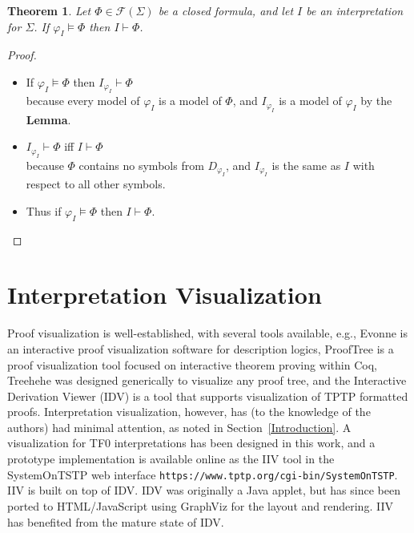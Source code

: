 \documentclass[letterpaper]{article}
\newcommand{\smalltt}[1]{\small \texttt{#1}}
\newtheorem*{theorem}{Theorem}
\begin{document}
\begin{theorem}
Let $\Phi \in \mathcal{F}(\Sigma)$ be a closed formula, and let $I$ be an interpretation for
$\Sigma$. 
If $\varphi_I \models \Phi$ then $I \vdash \Phi$.
\end{theorem}
\vspace*{-1em}
\begin{proof}
~\linebreak
\vspace*{-1.5em}
\begin{itemize}
\item If $\varphi_I \models \Phi$ then $I_{\varphi_I} \vdash \Phi$ \\
      because every model of $\varphi_I$ is a model of $\Phi$, and $I_{\varphi_I}$ is a model
      of $\varphi_I$ by the {\bf Lemma}.
\item $I_{\varphi_I} \vdash \Phi$ iff $I \vdash \Phi$ \\
      because $\Phi$ contains no symbols from $D_{\varphi_I}$, and $I_{\varphi_I}$ is the same
      as $I$ with respect to all other symbols.
\item Thus if $\varphi_I \models \Phi$ then $I \vdash \Phi$.
\end{itemize}
\end{proof}

\section{Interpretation Visualization}
\label{Visualization}

Proof visualization is well-established, with several tools available, e.g., 
Evonne \cite{AB+22} is an interactive proof visualization software for description logics,
ProofTree \cite{Tew17} is a proof visualization tool focused on interactive theorem proving within 
Coq,
Treehehe \cite{Bat18} was designed generically to visualize any proof tree,
and
the Interactive Derivation Viewer \cite{TPS07} (IDV) is a tool that supports visualization of 
TPTP formatted proofs.
Interpretation visualization, however, has (to the knowledge of the authors) had minimal attention,
as noted in Section~\ref{Introduction}. 
A visualization for TF0 interpretations has been designed in this work, and a prototype 
implementation is available online as the IIV tool in the SystemOnTSTP \cite{Sut07-CSR} web 
interface {\smalltt{https://www.tptp.org/cgi-bin/SystemOnTSTP}}.
IIV is built on top of IDV.
IDV was originally a Java applet, but has since been ported to HTML/JavaScript using GraphViz
\cite{EG+02} for the layout and rendering.
IIV has benefited from the mature state of IDV.
\end{document}
